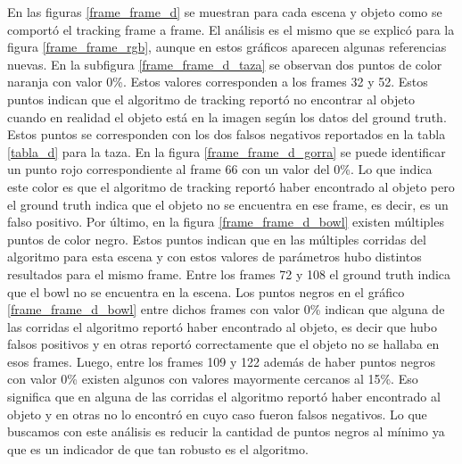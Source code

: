 En las figuras \ref{frame_frame_d} se muestran para cada escena y objeto como se comportó el tracking frame a frame. El análisis es el mismo que se explicó para la figura \ref{frame_frame_rgb}, aunque en estos gráficos aparecen algunas referencias nuevas. En la subfigura \ref{frame_frame_d_taza} se observan dos puntos de color naranja con valor 0\%. Estos valores corresponden a los frames 32 y 52. Estos puntos indican que el algoritmo de tracking reportó no encontrar al objeto cuando en realidad el objeto está en la imagen según los datos del ground truth. Estos puntos se corresponden con los dos falsos negativos reportados en la tabla \ref{tabla_d} para la taza. En la figura \ref{frame_frame_d_gorra} se puede identificar un punto rojo correspondiente al frame 66 con un valor del 0\%. Lo que indica este color es que el algoritmo de tracking reportó haber encontrado al objeto pero el ground truth indica que el objeto no se encuentra en ese frame, es decir, es un falso positivo. Por último, en la figura \ref{frame_frame_d_bowl} existen múltiples puntos de color negro. Estos puntos indican que en las múltiples corridas del algoritmo para esta escena y con estos valores de parámetros hubo distintos resultados para el mismo frame. Entre los frames 72 y 108 el ground truth indica que el bowl no se encuentra en la escena. Los puntos negros en el gráfico \ref{frame_frame_d_bowl} entre dichos frames con valor 0\% indican que alguna de las corridas el algoritmo reportó haber encontrado al objeto, es decir que hubo falsos positivos y en otras reportó correctamente que el objeto no se hallaba en esos frames. Luego, entre los frames 109 y 122 además de haber puntos negros con valor 0\% existen algunos con valores mayormente cercanos al 15\%. Eso significa que en alguna de las corridas el algoritmo reportó haber encontrado al objeto y en otras no lo encontró en cuyo caso fueron falsos negativos. Lo que buscamos con este análisis es reducir la cantidad de puntos negros al mínimo ya que es un indicador de que tan robusto es el algoritmo.

